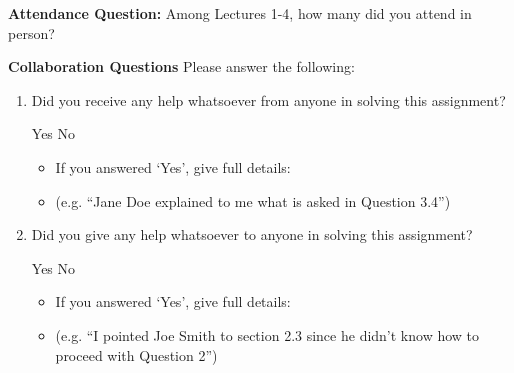 \documentclass[11pt,addpoints,answers]{exam}
\numberwithin{equation}{section} %
\numberwithin{figure}{section} %
\numberwithin{table}{section} %
\begin{document}
\clearpage
\textbf{Attendance Question:} Among Lectures 1-4, how many did you attend in person?

\begin{tcolorbox}[fit,height=1cm,blank, borderline={1pt}{-2pt},nobeforeafter]
\end{tcolorbox}

    
\textbf{Collaboration Questions} Please answer the following:

\begin{enumerate}
    \item Did you receive any help whatsoever from anyone in solving this assignment?
    \begin{checkboxes}
     \choice Yes
     \choice No
    \end{checkboxes}
    \begin{itemize}
        \item If you answered `Yes', give full details:
        \item (e.g. “Jane Doe explained to me what is asked in Question 3.4”)
    \end{itemize}

    \begin{tcolorbox}[fit,height=3cm,blank, borderline={1pt}{-2pt},nobeforeafter]
    \end{tcolorbox}

    \item Did you give any help whatsoever to anyone in solving this assignment?
    \begin{checkboxes}
     \choice Yes
     \choice No
    \end{checkboxes}
    \begin{itemize}
        \item If you answered `Yes', give full details:
        \item (e.g. “I pointed Joe Smith to section 2.3 since he didn’t know how to proceed with Question 2”)
    \end{itemize}

    \begin{tcolorbox}[fit,height=3cm,blank, borderline={1pt}{-2pt},nobeforeafter]
    \end{tcolorbox}


\end{enumerate}
\end{document}
